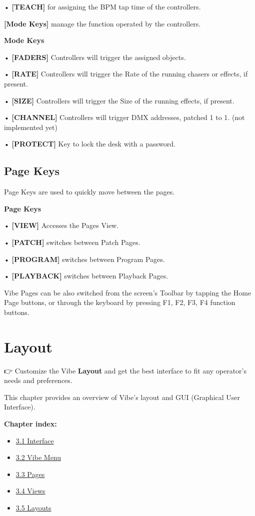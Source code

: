 \documentclass[
]{article}
\providecommand{\tightlist}{%
  \setlength{\itemsep}{0pt}\setlength{\parskip}{0pt}}
\begin{document}
• \textbf{{[}TEACH{]}} for assigning the BPM tap time of the controllers.

\textbf{{[}Mode Keys{]}} manage the function operated by the controllers.

\textbf{Mode Keys}

• \textbf{{[}FADERS{]}} Controllers will trigger the assigned objects.

• \textbf{{[}RATE{]}} Controllers will trigger the Rate of the running chasers or effects, if present.

• \textbf{{[}SIZE{]}} Controllers will trigger the Size of the running effects, if present.

• \textbf{{[}CHANNEL{]}} Controllers will trigger DMX addresses, patched 1 to 1. (not implemented yet)

• \textbf{{[}PROTECT{]}} Key to lock the desk with a password.

\hypertarget{Page-Keys-2.8}{%
\subsection{Page Keys}\label{Page-Keys-2.8}}

Page Keys are used to quickly move between the pages.

\textbf{Page Keys}

• \textbf{{[}VIEW{]}} Accesses the Pages View.

• \textbf{{[}PATCH{]}} switches between Patch Pages.

• \textbf{{[}PROGRAM{]}} switches between Program Pages.

• \textbf{{[}PLAYBACK{]}} switches between Playback Pages.

Vibe Pages can be also switched from the screen's Toolbar by tapping the Home Page buttons, or through the keyboard by pressing F1, F2, F3, F4 function buttons.

\hypertarget{layout}{%
\section{Layout}\label{layout}}

👉 Customize the Vibe \textbf{Layout} and get the best interface to fit any operator's needs and preferences.

This chapter provides an overview of Vibe's layout and GUI (Graphical User Interface).

\textbf{Chapter index:}

\begin{itemize}
\tightlist
\item
  \protect\hyperlink{Interface-3.1}{3.1 Interface}
\item
  \protect\hyperlink{Vibe-Menu-3.2}{3.2 Vibe Menu}
\item
  \protect\hyperlink{Pages-3.3}{3.3 Pages}
\item
  \protect\hyperlink{Views-3.4}{3.4 Views}
\item
  \protect\hyperlink{Layouts-3.5}{3.5 Layouts}
\end{itemize}
\end{document}
